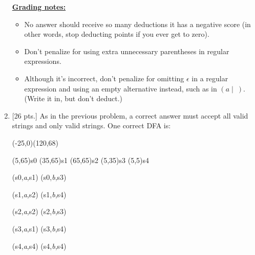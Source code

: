 \documentclass[11pt,fleqn]{article}
\begin{document}
\begin{enumerate}
\begin{info}{\textbf{\underline{Grading notes:}}}
\begin{itemize}
              \item No answer should receive so many deductions it has a
                    negative score (in other words, stop deducting points if
                    you ever get to zero).

              \item Don't penalize for using extra unnecessary parentheses
                    in regular expressions.

              \item Although it's incorrect, don't penalize for omitting
                    $\epsilon$ in a regular expression and using an empty
                    alternative instead, such as in $(a \mid \: )$.  (Write
                    it in, but don't deduct.)

            \end{itemize}

          \end{info}


    \item {[26 pts.]} As in the previous problem, a correct answer must
          accept all valid strings and only valid strings.  One correct DFA
          is:

          \begin{automaton}(-25,0)(120,68)


            (5,65){s0}
            \state(35,65){s1}
            \state[final](65,65){s2}
            \state[final](5,35){s3}
            \state(5,5){s4}

            \transition(s0,\emph{a},s1)
            \transition[labellocation=below](s0,\emph{b},s3)

            \transition(s1,\emph{a},s2)
            \transition(s1,\emph{b},s4)

            \transition[loopdirection=right](s2,\emph{a},s2)
            \transition(s2,\emph{b},s3)

            \transition(s3,\emph{a},s1)
            \transition(s3,\emph{b},s4)

            \transition[loopdirection=left](s4,\emph{a},s4)
            \transition[loopdirection=right](s4,\emph{b},s4)

          \end{automaton}


\end{enumerate}
\end{document}
